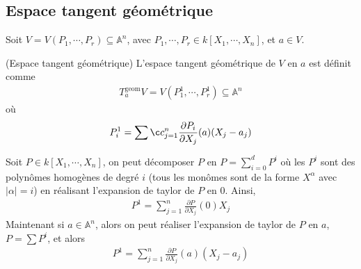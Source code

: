         \subsection{Espace tangent géométrique}
            Soit $V = V(P_1, \cdots, P_r) \subseteq \mathbb{A}^n$, avec $P_1, \cdots, P_r \in k[X_1, \cdots, X_n]$, et $a \in V$.
            \begin{defi} (Espace tangent géométrique)
                L'espace tangent géométrique de $V$ en $a$ est définit comme
                \begin{align*}
                    T_a^\mathrm{geom} V = V(P^1_1, \cdots, P_r^1) \subseteq \mathbb{A}^n
                \end{align*}
                où 
                \begin{align*}
                    P_i^1 = \sumç_{j = 1}^n \frac{\partial P_i}{\partial X_j}(a) (X_j - a_j)
                \end{align*}
            \end{defi}
            \begin{remq}
                Soit $P \in k[X_1, \cdots, X_n]$, on peut décomposer $P$ en $P = \sum_{i = 0}^d P^i$ où les $P^i$ sont des polynômes homogènes de degré $i$ (tous les monômes sont de la forme $X^\alpha$ avec $|\alpha| = i$) en réalisant l'expansion de taylor de $P$ en $0$. Ainsi, 
                \begin{align*}
                    P^1 = \sum_{j = 1}^n \frac{\partial P}{\partial X_j}(0) X_j
                \end{align*}
                Maintenant si $a \in \mathbb{A}^n$, alors on peut réaliser l'expansion de taylor de $P$ en $a$, $P = \sum P^i$, et alors
                \begin{align*}
                    P^1 = \sum_{j = 1}^n \frac{\partial P}{\partial X_j}(a) (X_j - a_j)
                \end{align*}
            \end{remq}
